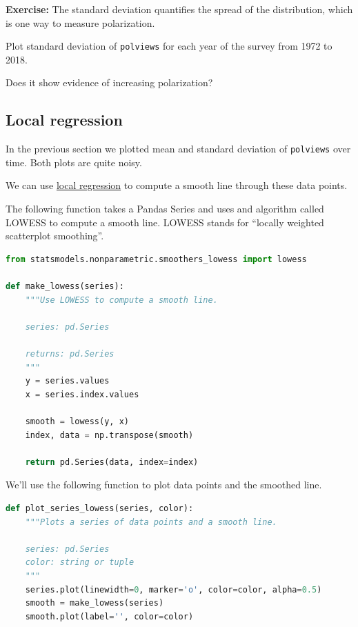 \textbf{Exercise:} The standard deviation quantifies the spread of the
distribution, which is one way to measure polarization.

Plot standard deviation of \passthrough{\lstinline!polviews!} for each
year of the survey from 1972 to 2018.

Does it show evidence of increasing polarization?

\hypertarget{local-regression}{%
\subsection{Local regression}\label{local-regression}}

In the previous section we plotted mean and standard deviation of
\passthrough{\lstinline!polviews!} over time. Both plots are quite
noisy.

We can use \href{https://en.wikipedia.org/wiki/Local_regression}{local
regression} to compute a smooth line through these data points.

The following function takes a Pandas Series and uses and algorithm
called LOWESS to compute a smooth line. LOWESS stands for ``locally
weighted scatterplot smoothing''.

\begin{lstlisting}[language=Python]
from statsmodels.nonparametric.smoothers_lowess import lowess

def make_lowess(series):
    """Use LOWESS to compute a smooth line.
    
    series: pd.Series
    
    returns: pd.Series
    """
    y = series.values
    x = series.index.values

    smooth = lowess(y, x)
    index, data = np.transpose(smooth)

    return pd.Series(data, index=index) 
\end{lstlisting}

We'll use the following function to plot data points and the smoothed
line.

\begin{lstlisting}[language=Python]
def plot_series_lowess(series, color):
    """Plots a series of data points and a smooth line.
    
    series: pd.Series
    color: string or tuple
    """
    series.plot(linewidth=0, marker='o', color=color, alpha=0.5)
    smooth = make_lowess(series)
    smooth.plot(label='', color=color)
\end{lstlisting}

